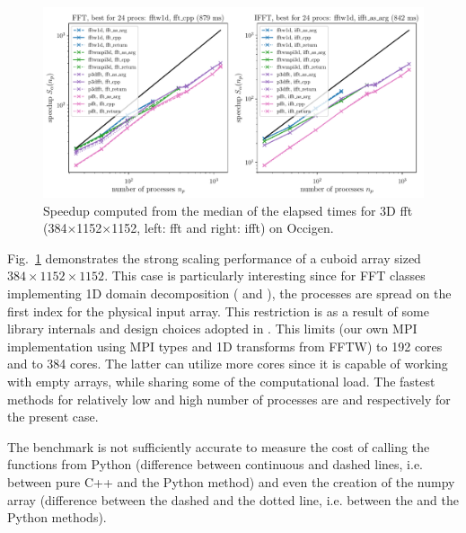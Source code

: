 \begin{figure}[htp!]
\centering
\includegraphics[width=\linewidth]{tmp/fig_occigen_384x1152x1152}
\caption{Speedup computed from the median of the elapsed times for 3D fft
(384$\times$1152$\times$1152, left: fft and right: ifft) on Occigen.}%
\label{fig:occigen384x1152x1152}
\end{figure}

Fig.~\ref{fig:occigen384x1152x1152} demonstrates the strong scaling performance
of a cuboid array sized $384\times1152\times1152$. This case is particularly
interesting since for FFT classes implementing 1D domain decomposition
( and ), the processes are spread on
the first index for the physical input array. This restriction is as a result
of some  library internals and design choices adopted in
. This limits  (our own MPI implementation
using MPI types and 1D transforms from FFTW) to 192 cores and
 to 384 cores. The latter can utilize more cores since it
is capable of working with empty arrays, while sharing some of the
computational load.
%
The fastest methods for relatively
low and high number of processes are  and
 respectively for the present case.

The benchmark is not sufficiently accurate to measure the cost of calling the
functions from Python (difference between continuous and dashed lines,
i.e. between pure C++ and the  Python method) and even the
creation of the numpy array (difference between the dashed and the dotted line,
i.e. between the  and the  Python
methods).


